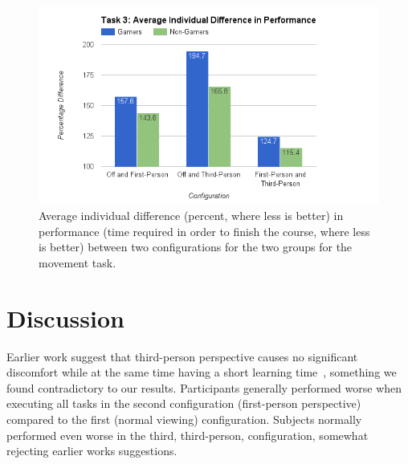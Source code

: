 \documentclass[runningheads,a4paper,oribibl]{llncs}
\begin{document}
\begin{figure}
   \centering
   \includegraphics[width=\textwidth]{ExternalMaterial/Task3GraphD}
   \caption{Average individual difference (percent, where less is better) in performance (time required in order to finish the course, where less is better) between two configurations for the two groups for the movement task.} \label{fig:Task3GraphD}
\end{figure}


















% 





\section{Discussion} \label{sec:Discussion}
Earlier work suggest that third-person perspective causes no significant discomfort while at the same time having a short learning time~\cite{nakamura20103pi}, something we found contradictory to our results. Participants generally performed worse when executing all tasks in the second configuration (first-person perspective) compared to the first (normal viewing) configuration. Subjects normally performed even worse in the third, third-person, configuration, somewhat rejecting earlier works suggestions. 
\end{document}
